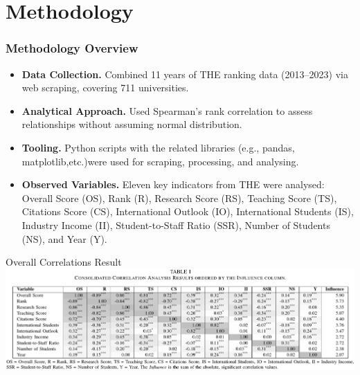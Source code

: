 \documentclass[aspectratio=169, table]{beamer}
\begin{document}
\section{Methodology}
\begin{frame}
	\vspace{20pt}
	\frametitle{Methodology Overview}
	\begin{itemize}
		\item \textbf{Data Collection.} Combined 11 years of THE ranking data (2013–2023) via web scraping, covering 711 universities.
		\item \textbf{Analytical Approach.} Used Spearman’s rank correlation to assess relationships without assuming normal distribution.
		\item \textbf{Tooling.} Python scripts with the related libraries (e.g., pandas, matplotlib,etc.)were used for scraping, processing, and analysing.
		\item \textbf{Observed Variables.} Eleven key indicators from THE were analysed: Overall Score (OS), Rank (R), Research Score (RS), Teaching Score (TS), Citations Score (CS), International Outlook (IO), International Students (IS), Industry Income (II), Student-to-Staff Ratio (SSR), Number of Students (NS), and Year (Y).
		
	\end{itemize}
\end{frame}

\begin{frame}{Overall Correlations Result}
	\vspace{10pt}
	\centering
	\includegraphics[width=1.03\linewidth]{figures/table1.png}
\end{frame}
\end{document}
